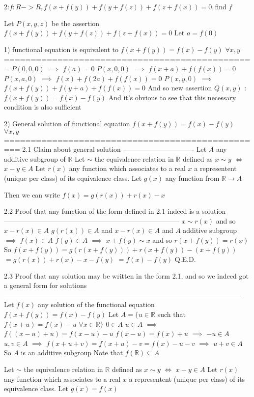 \begin{solution}
	\begin{tcolorbox}2:$f:R->R,f(x+f(y))+f(y+f(z))+f(z+f(x))=0,$find $f$\end{tcolorbox}
Let $P(x,y,z)$ be the assertion $f(x+f(y))+f(y+f(z))+f(z+f(x))=0$
Let $a=f(0)$

1) functional equation is equivalent to $f(x+f(y))=f(x)-f(y)$ $\forall x,y$
===============================================
$P(0,0,0)$ $\implies$ $f(a)=0$
$P(x,0,0)$ $\implies$ $f(x+a)+f(f(x))=0$
$P(x,a,0)$ $\implies$ $f(x)+f(2a)+f(f(x))=0$
$P(x,y,0)$ $\implies$ $f(x+f(y))+f(y+a)+f(f(x))=0$
And so new assertion $Q(x,y)$ : $f(x+f(y))=f(x)-f(y)$
And it's obvious to see that this necessary condition is also sufficient

2) General solution of functional equation $f(x+f(y))=f(x)-f(y)$ $\forall x,y$
=================================================
2.1 Claim about general solution
-------------------------------
Let $A$ any additive subgroup of $\mathbb R$
Let $\sim$ the equivalence relation in $\mathbb R$ defined as $x\sim y$ $\iff$ $x-y\in A$
Let $r(x)$ any function which associates to a real $x$ a representent (unique per class) of its equivalence class.
Let $g(x)$ any function from $\mathbb R\to A$

Then we can write $f(x)=g(r(x))+r(x)-x$

2.2 Proof that any function of the form defined in 2.1 indeed is a solution
-----------------------------------------------------------------------------
$x\sim r(x)$ and so $x-r(x)\in A$
$g(r(x))\in A$ and $x-r(x)\in A$ and $A$ additive subgroup $\implies$ $f(x)\in A$
$f(y)\in A$ $\implies$ $x+f(y)\sim x$ and so $r(x+f(y))=r(x)$
So $f(x+f(y))=g(r(x+f(y)))+r(x+f(y))-(x+f(y))$ $=g(r(x))+r(x)-x-f(y)$ $=f(x)-f(y)$
Q.E.D.

2.3 Proof that any solution may be written in the form 2.1, and so we indeed got a general form for solutions
--------------------------------------------------------------------------------------------------------
Let $f(x)$ any solution of the functional equation $f(x+f(y))=f(x)-f(y)$
Let $A=\{u\in\mathbb R$ such that $f(x+u)=f(x)-u$ $\forall x\in\mathbb R\}$
$0\in A$
$u\in A$ $\implies$ $f((x-u)+u)=f(x-u)-u$ $f(x-u)=f(x)+u$ $\implies$ $-u\in A$
$u,v\in A$ $\implies$ $f(x+u+v)=f(x+u)-v=f(x)-u-v$ $\implies$ $u+v\in A$
So $A$ is an additive subgroup
Note that $f(\mathbb R)\subseteq A$

Let $\sim$ the equivalence relation in $\mathbb R$ defined as $x\sim y$ $\iff$ $x-y\in A$
Let $r(x)$ any function which associates to a real $x$ a representent (unique per class) of its equivalence class.
Let $g(x)=f(x)$


\end{solution}
